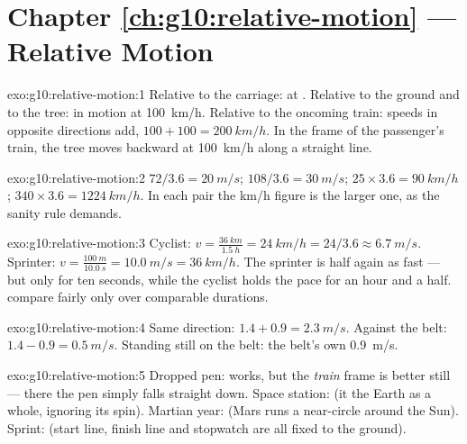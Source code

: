 \section*{Chapter \ref{ch:g10:relative-motion} --- Relative Motion}

\begin{solution}{exo:g10:relative-motion:1}
Relative to the carriage: at . Relative to the ground and to the
tree: in motion at \qty{100}{km/h}. Relative to the oncoming train:
speeds in opposite directions add, $100 + 100 = \qty{200}{km/h}$. In the
frame of the passenger's train, the tree moves backward at
\qty{100}{km/h} along a straight line.
\end{solution}

\begin{solution}{exo:g10:relative-motion:2}
$72 / 3.6 = \qty{20}{m/s}$; $108 / 3.6 = \qty{30}{m/s}$;
$25 \times 3.6 = \qty{90}{km/h}$; $340 \times 3.6 = \qty{1224}{km/h}$.
In each pair the \unit{km/h} figure is the larger one, as the sanity
rule demands.
\end{solution}

\begin{solution}{exo:g10:relative-motion:3}
Cyclist: $v = \frac{\qty{36}{km}}{\qty{1.5}{h}} = \qty{24}{km/h}
= 24/3.6 \approx \qty{6.7}{m/s}$. Sprinter:
$v = \frac{\qty{100}{m}}{\qty{10.0}{s}} = \qty{10.0}{m/s}
= \qty{36}{km/h}$. The sprinter is half again as fast --- but only for
ten seconds, while the cyclist holds the pace for an hour and a half.
 compare fairly only over comparable durations.
\end{solution}

\begin{solution}{exo:g10:relative-motion:4}
Same direction: $1.4 + 0.9 = \qty{2.3}{m/s}$. Against the belt:
$1.4 - 0.9 = \qty{0.5}{m/s}$. Standing still on the belt: the belt's own
\qty{0.9}{m/s}.
\end{solution}

\begin{solution}{exo:g10:relative-motion:5}
Dropped pen:  works, but the \emph{train} frame is better
still --- there the pen simply falls straight down. Space station:
 (it  the Earth as a whole, ignoring its spin).
Martian year:  (Mars runs a near-circle around the
Sun). Sprint:  (start line, finish line and stopwatch are
all fixed to the ground).
\end{solution}


